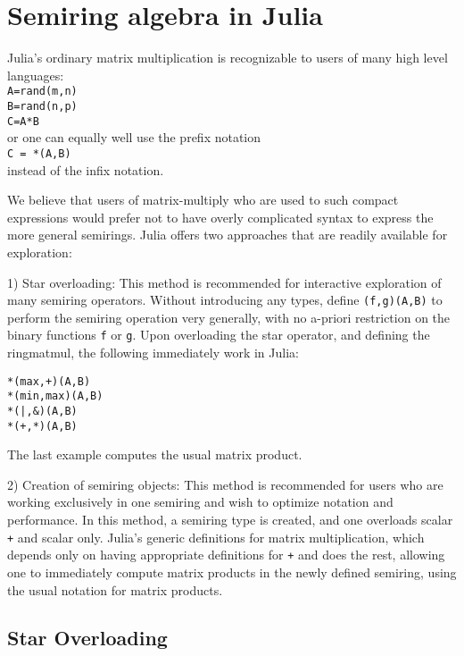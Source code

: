 \documentclass[conference]{IEEEtran}
\begin{document}
\section{Semiring algebra in Julia}

Julia's ordinary matrix multiplication is recognizable to users of many
high level languages: \\
{\tt A=rand(m,n) \\  B=rand(n,p) \\ C=A*B } \\
or one can equally well use the prefix notation \\
{\tt C = *(A,B)} \\
instead of the infix notation.

We believe that users of matrix-multiply who are used
to such compact expressions would prefer not to have
overly complicated syntax to express the more general
semirings.  Julia offers two approaches that are readily
available for exploration:

1) Star overloading:
This method is recommended for interactive exploration of many semiring operators.
Without introducing any types, define  {\tt *(f,g)(A,B)} to
perform the semiring operation very generally, with no a-priori restriction
on the binary functions {\tt f} or {\tt g}.   Upon overloading the star operator,
and defining the ringmatmul, the following immediately work in Julia:
\begin{verbatim}
*(max,+)(A,B)
*(min,max)(A,B)
*(|,&)(A,B)
*(+,*)(A,B)
\end{verbatim}
The last example computes the usual matrix product.

2) Creation of semiring objects:
This method is recommended for users who are working exclusively in one semiring and wish to optimize notation and performance.
In this method, a semiring type is created, and one overloads scalar {\tt +} and scalar {\tt *} only.
Julia's generic definitions for matrix multiplication, which depends only on having appropriate definitions for {\tt +} and {\tt *} does the rest, allowing one to immediately compute matrix products in the newly defined semiring, using the usual notation for matrix products.

\subsection{Star Overloading}
\end{document}
